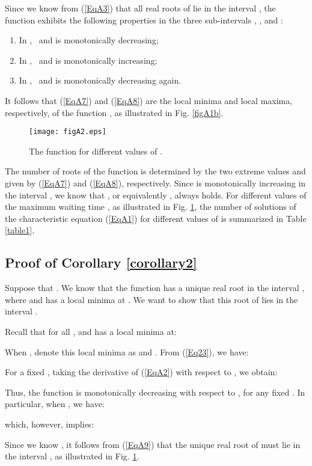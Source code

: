 \documentclass[journal]{IEEEtran}
\begin{document}
Since we know from (\ref{EqA3}) that all real roots of  lie in the interval , the function  exhibits the following properties in the three sub-intervals , , and :
\begin{enumerate}
  \item [1)] In ,~ and  is monotonically decreasing;
  \item [2)] In ,~ and  is monotonically increasing;
  \item [3)] In ,~ and  is monotonically decreasing again.
\end{enumerate}
It follows that (\ref{EqA7}) and (\ref{EqA8}) are the local minima and local maxima, respectively, of the function , as illustrated in Fig. \ref{figA1b}.

\begin{figure}[t]
\centering
\texttt{[image: figA2.eps]}
\caption{The function  for different values of .}\label{figA2}
\end{figure}

The number of roots of the function  is determined by the two extreme values  and  given by (\ref{EqA7}) and (\ref{EqA8}), respectively. Since  is monotonically increasing in the interval , we know that , or equivalently  , always holds. For different values of the maximum waiting time , as illustrated in Fig. \ref{figA2}, the number of solutions of the characteristic equation (\ref{EqA1}) for different values of  is summarized in Table \ref{table1}.

\subsection{Proof of Corollary \ref{corollary2}}
Suppose that . We know that the function  has a unique real root in the interval , where  and  has a local minima at . We want to show that this root of  lies in the interval .

Recall that  for all , and  has a local minima at:

When , denote this local minima as  and . From (\ref{Eq23}), we have:

For a fixed , taking the derivative of (\ref{EqA2}) with respect to , we obtain:

Thus, the function  is monotonically decreasing with respect to , for any fixed . In particular, when , we have:

which, however, implies:

Since we know , it follows from (\ref{EqA9}) that the unique real root of  must lie in the interval , as illustrated in Fig. \ref{figA2}.


\end{document}
